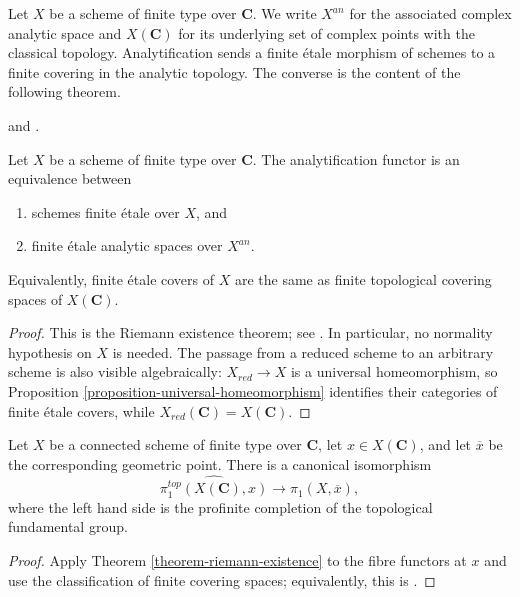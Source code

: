 \noindent
Let $X$ be a scheme of finite type over $\mathbf{C}$. We write $X^{an}$ for
the associated complex analytic space and $X(\mathbf{C})$ for its underlying
set of complex points with the classical topology. Analytification sends a
finite \'etale morphism of schemes to a finite covering in the analytic
topology. The converse is the content of the following theorem.

\begin{theorem}
\label{theorem-riemann-existence}
\begin{reference}
\cite[Expos\'e 190, n\textsuperscript{o} 3, pp. 308--310]{FGA} and
\cite[Expos\'e XII, Th\'eor\`eme 5.1]{SGA1}.
\end{reference}
Let $X$ be a scheme of finite type over $\mathbf{C}$. The analytification
functor is an equivalence between
\begin{enumerate}
\item schemes finite \'etale over $X$, and
\item finite \'etale analytic spaces over $X^{an}$.
\end{enumerate}
Equivalently, finite \'etale covers of $X$ are the same as finite topological
covering spaces of $X(\mathbf{C})$.
\end{theorem}

\begin{proof}
This is the Riemann existence theorem; see
\cite[Expos\'e XII, Th\'eor\`eme 5.1]{SGA1}. In particular, no normality
hypothesis on $X$ is needed. The passage from a reduced scheme to an arbitrary
scheme is also visible algebraically: $X_{red} \to X$ is a universal
homeomorphism, so Proposition \ref{proposition-universal-homeomorphism}
identifies their categories of finite \'etale covers, while
$X_{red}(\mathbf{C}) = X(\mathbf{C})$.
\end{proof}

\begin{lemma}
\label{lemma-fundamental-group-complex}
Let $X$ be a connected scheme of finite type over $\mathbf{C}$, let
$x \in X(\mathbf{C})$, and let $\overline{x}$ be the corresponding geometric
point. There is a canonical isomorphism
$$
\widehat{\pi_1^{top}(X(\mathbf{C}), x)}
\longrightarrow
\pi_1(X, \overline{x}),
$$
where the left hand side is the profinite completion of the topological
fundamental group.
\end{lemma}

\begin{proof}
Apply Theorem \ref{theorem-riemann-existence} to the fibre functors at $x$ and
use the classification of finite covering spaces; equivalently, this is
\cite[Expos\'e XII, Corollaire 5.2]{SGA1}.
\end{proof}




